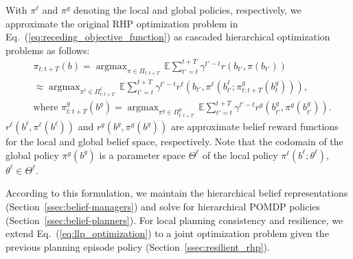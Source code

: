 \documentclass[letterpaper]{article} %
\newcommand{\phdone}[1]{} %
\newcommand{\argmax}{\mathop{\mathrm{argmax}}}
\begin{document}
With $\pi^\ell$ and $\pi^g$ denoting the local and global policies, respectively, we approximate the original RHP optimization problem in Eq.~(\ref{eq:receding_objective_function}) as cascaded hierarchical optimization problems as follows:
\begin{align}
  &\pi_{t:t+T}(b)
  = \argmax_{\pi \in \Pi_{t:t+T}} \, \mathbb{E} \sum_{t'=t}^{t+T} \gamma^{t'-t} r(b_{t'}, \pi(b_{t'}))
  \nonumber \\
  & \approx \argmax_{\pi^\ell \in \Pi^\ell_{t:t+T}} \, \mathbb{E} \sum_{t'=t}^{t+T} \gamma^{t'-t} r^\ell(b_{t'}, \pi^\ell(b^\ell_{t'}; \pi_{t:t+T}^g(b^g_t))),
  \label{eq:llp_optimization}
  \\
  &\text{where }
  \pi_{t:t+T}^g(b^g) = \argmax_{\pi^g \in \Pi^g_{t:t+T}} \, \mathbb{E} \sum_{t'=t}^{t+T} \gamma^{t'-t} r^g(b^g_{t'}, \pi^g(b^g_{t'})).
  \label{eq:glp_optimization}
\end{align}
$r^\ell(b^\ell, \pi^\ell(b^\ell))$ and $r^g(b^g, \pi^g(b^g))$ are approximate belief reward functions for the local and global belief space, respectively.
%
Note that the codomain of the global policy $\pi^g(b^g)$ is a parameter space $\Theta^\ell$ of the local policy $\pi^\ell(b^\ell; \theta^\ell)$, $\theta^\ell \!\! \in \! \Theta^\ell\!$.\,

\phdone{Section Structure}
According to this formulation, we maintain the hierarchical belief representations (Section~\ref{ssec:belief-managers}) and solve for hierarchical POMDP policies (Section~\ref{ssec:belief-planners}).
For local planning consistency and resilience, we extend Eq.~(\ref{eq:llp_optimization}) to a joint optimization problem given the previous planning episode policy (Section~\ref{ssec:resilient_rhp}).




\end{document}

